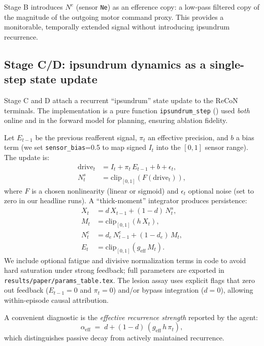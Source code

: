 \documentclass[letterpaper]{article} %
\begin{document}
Stage B introduces $N^e$ (sensor \texttt{Ne}) as an efference copy: a low-pass filtered copy of the magnitude of the outgoing motor command proxy. This provides a monitorable, temporally extended signal without introducing ipsundrum recurrence.

\subsection{Stage C/D: ipsundrum dynamics as a single-step state update}
Stage C and D attach a recurrent ``ipsundrum'' state update to the ReCoN terminals. The implementation is a pure function \texttt{ipsundrum\_step} () used \emph{both} online and in the forward model for planning, ensuring ablation fidelity.

Let $E_{t-1}$ be the previous reafferent signal, $\pi_t$ an effective precision, and $b$ a bias term (we set \texttt{sensor\_bias}=0.5 to map signed $I_t$ into the $[0,1]$ sensor range). The update is:
\begin{align}
\text{drive}_t &= I_t + \pi_t\,E_{t-1} + b + \epsilon_t,\\
N^s_t &= \mathrm{clip}_{[0,1]}\!\left(F(\text{drive}_t)\right),
\end{align}
where $F$ is a chosen nonlinearity (linear or sigmoid) and $\epsilon_t$ optional noise (set to zero in our headline runs).
A ``thick-moment'' integrator produces persistence:
\begin{align}
X_t &= d\,X_{t-1} + (1-d)\,N^s_t,\\
M_t &= \mathrm{clip}_{[0,1]}(h\,X_t),\\
N^e_t &= d_e\,N^e_{t-1} + (1-d_e)\,M_t,\\
E_t &= \mathrm{clip}_{[0,1]}(g_{\text{eff}}\,M_t).
\end{align}
We include optional fatigue and divisive normalization terms in code to avoid hard saturation under strong feedback; full parameters are exported in \texttt{results/paper/params\_table.tex}.
The lesion assay uses explicit flags that zero out feedback ($E_{t-1}\!=\!0$ and $\pi_t\!=\!0$) and/or bypass integration ($d\!=\!0$), allowing within-episode causal attribution.

A convenient diagnostic is the \emph{effective recurrence strength} reported by the agent:
\begin{equation}
\alpha_{\text{eff}}\;=\; d + (1-d)\,(g_{\text{eff}}\,h\,\pi_t),
\end{equation}
which distinguishes passive decay from actively maintained recurrence.
\end{document}
